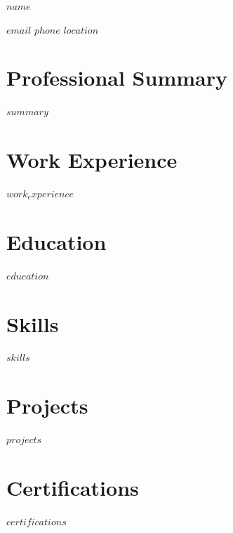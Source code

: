 \documentclass[11pt,a4paper]{article}
\newcommand{\HeaderName}[1]{{\fontsize{28pt}{30pt}\selectfont\textbf{\textcolor{darktext}{#1}}}}
\newcommand{\HeaderInfo}[1]{{\small\color{darktext}#1}}
\begin{document}
\centerline{\HeaderName{$name$}}
\vspace{4pt}
\centerline{\HeaderInfo{$email$ \quad $phone$ \quad $location$}}
\vspace{10pt}

\section*{Professional Summary}
$summary$

\section*{Work Experience}
$work_experience$

\section*{Education}
$education$

\section*{Skills}
$skills$

\section*{Projects}
$projects$

\section*{Certifications}
$certifications$
\end{document}
